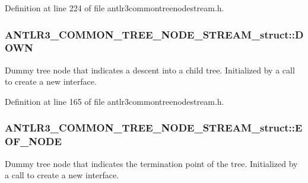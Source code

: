 Definition at line 224 of file antlr3commontreenodestream.\-h.

\hypertarget{struct_a_n_t_l_r3___c_o_m_m_o_n___t_r_e_e___n_o_d_e___s_t_r_e_a_m__struct_ab8892007f3fe4a458845a639044d684a}{
\subsubsection[{D\-O\-W\-N}]{ A\-N\-T\-L\-R3\-\_\-\-C\-O\-M\-M\-O\-N\-\_\-\-T\-R\-E\-E\-\_\-\-N\-O\-D\-E\-\_\-\-S\-T\-R\-E\-A\-M\-\_\-struct\-::\-D\-O\-W\-N}}\label{struct_a_n_t_l_r3___c_o_m_m_o_n___t_r_e_e___n_o_d_e___s_t_r_e_a_m__struct_ab8892007f3fe4a458845a639044d684a}
Dummy tree node that indicates a descent into a child tree. Initialized by a call to create a new interface. 

Definition at line 165 of file antlr3commontreenodestream.\-h.

\hypertarget{struct_a_n_t_l_r3___c_o_m_m_o_n___t_r_e_e___n_o_d_e___s_t_r_e_a_m__struct_aa8ffdbca7577793ed1a40a6bdec6aeb7}{
\subsubsection[{E\-O\-F\-\_\-\-N\-O\-D\-E}]{ A\-N\-T\-L\-R3\-\_\-\-C\-O\-M\-M\-O\-N\-\_\-\-T\-R\-E\-E\-\_\-\-N\-O\-D\-E\-\_\-\-S\-T\-R\-E\-A\-M\-\_\-struct\-::\-E\-O\-F\-\_\-\-N\-O\-D\-E}}\label{struct_a_n_t_l_r3___c_o_m_m_o_n___t_r_e_e___n_o_d_e___s_t_r_e_a_m__struct_aa8ffdbca7577793ed1a40a6bdec6aeb7}
Dummy tree node that indicates the termination point of the tree. Initialized by a call to create a new interface. 

